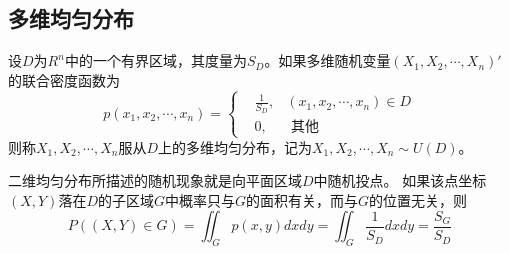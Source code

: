 \subsection{多维均匀分布}
\begin{definition}
设$D$为$R^n$中的一个有界区域，其度量为$S_D$。如果多维随机变量$(X_{1}, X_{2}, \cdots, X_{n})'$的联合密度函数为
$$p\left(x_{1}, x_{2}, \cdots, x_{n}\right)=\left\{
\begin{aligned}
&\frac{1}{S_{D}}, & \left(x_{1}, x_{2}, \cdots, x_{n}\right) \in D \\
&0, & \text { 其他 }
\end{aligned}
\right.$$
则称$X_{1}, X_{2}, \cdots, X_{n}$服从$D$上的多维均匀分布，记为$X_{1}, X_{2}, \cdots, X_{n}\sim U(D) $。
\end{definition}
\begin{remark}
 二维均匀分布所描述的随机现象就是向平面区域$D$中随机投点。
 如果该点坐标$(X,Y)$落在$D$的子区域$G$中概率只与$G$的面积有关，而与$G$的位置无关，则$$P((X, Y) \in G)=\iint_{G} p(x, y) d x d y=\iint_{G} \frac{1}{S_{D}} d x d y=\frac{S_{G}}{S_{D}}$$   
\end{remark}


